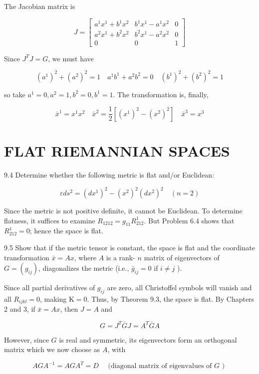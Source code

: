 \documentclass[10pt]{article}
\begin{document}
The Jacobian matrix is

$$
J=\left[\begin{array}{ccc}
a^{1} x^{1}+b^{1} x^{2} & b^{1} x^{1}-a^{1} x^{2} & 0 \\
a^{2} x^{1}+b^{2} x^{2} & b^{2} x^{1}-a^{2} x^{2} & 0 \\
0 & 0 & 1
\end{array}\right]
$$

Since $J^{T} J=G$, we must have

$$
\left(a^{1}\right)^{2}+\left(a^{2}\right)^{2}=1 \quad a^{1} b^{1}+a^{2} b^{2}=0 \quad\left(b^{1}\right)^{2}+\left(b^{2}\right)^{2}=1
$$

so take $a^{1}=0, a^{2}=1, b^{2}=0, b^{1}=1$. The transformation is, finally,

$$
\bar{x}^{1}=x^{1} x^{2} \quad \bar{x}^{2}=\frac{1}{2}\left[\left(x^{1}\right)^{2}-\left(x^{2}\right)^{2}\right] \quad \bar{x}^{3}=x^{3}
$$

\section*{FLAT RIEMANNIAN SPACES}
9.4 Determine whether the following metric is flat and/or Euclidean:

$$
\varepsilon d s^{2}=\left(d x^{1}\right)^{2}-\left(x^{2}\right)^{2}\left(d x^{2}\right)^{2} \quad(n=2)
$$

Since the metric is not positive definite, it cannot be Euclidean. To determine flatness, it suffices to examine $R_{1212}=g_{11} R_{212}^{1}$. But Problem 6.4 shows that $R_{212}^{1}=0$; hence the space is flat.

9.5 Show that if the metric tensor is constant, the space is flat and the coordinate transformation $\bar{x}=A x$, where $A$ is a rank- $n$ matrix of eigenvectors of $G=\left(g_{i j}\right)$, diagonalizes the metric (i.e., $\bar{g}_{i j}=0$ if $i \neq j$ ).

Since all partial derivatives of $g_{i j}$ are zero, all Christoffel symbols will vanish and all $R_{i j k l}=0$, making $\mathrm{K}=0$. Thus, by Theorem 9.3, the space is flat. By Chapters 2 and 3, if $\bar{x}=A x$, then $J=A$ and

$$
G=J^{T} \bar{G} J=A^{T} \bar{G} A
$$

However, since $G$ is real and symmetric, its eigenvectors form an orthogonal matrix which we now choose as $A$, with

$$
A G A^{-1}=A G A^{T}=D \quad \text { (diagonal matrix of eigenvalues of } G \text { ) }
$$
\end{document}
